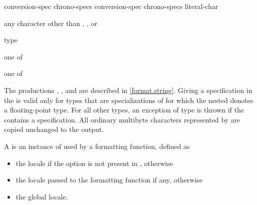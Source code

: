 \begin{ncbnf}
\br
        
\end{ncbnf}

\begin{ncbnf}
\br
    conversion-spec\br
    chrono-specs conversion-spec\br
    chrono-specs literal-char
\end{ncbnf}

\begin{ncbnf}
\br
    \textnormal{any character other than \tcode{\{}, \tcode{\}}, or \tcode{\%}}
\end{ncbnf}

\begin{ncbnf}
\br
    \terminal{\%}  type
\end{ncbnf}

\begin{ncbnf}
 \textnormal{one of}\br
\end{ncbnf}

\begin{ncbnf}
 \textnormal{one of}\br
    \br
\end{ncbnf}

The productions
,
, and
are described in \ref{format.string}.
Giving a  specification
in the 
is valid only for types that are
specializations of 
for which the nested   denotes
a floating-point type.
For all other types,
an exception of type  is thrown
if the 
contains a  specification.
All ordinary multibyte characters
represented by 
are copied unchanged to the output.

\pnum
A  is an instance of 
used by a formatting function, defined as
\begin{itemize}
\item
the  locale if the  option
is not present in , otherwise
\item
the locale passed to the formatting function if any, otherwise
\item
the global locale.
\end{itemize}

